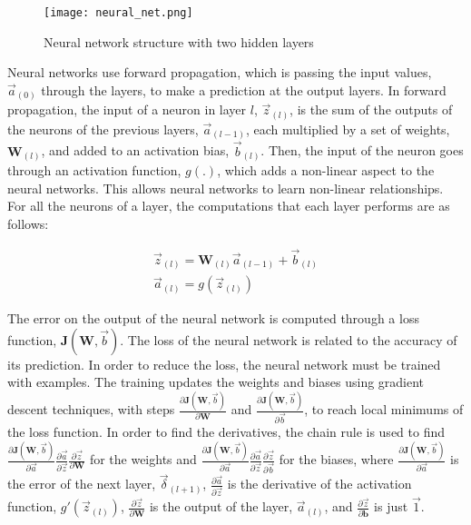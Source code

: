 \documentclass[conference]{IEEEtran}
\begin{document}
\begin{figure}[h]
\centering
\texttt{[image: neural\_net.png]}
\caption{Neural network structure with two hidden layers}
\label{fig:NNStructure}
\end{figure}

Neural networks use forward propagation, which is passing the input values, $\vec{a}_{(0)}$  through the layers, to make a prediction at the output layers. In forward propagation, the input of a neuron in layer $l$, $\vec{z}_{(l)}$, is the sum of the outputs of the neurons of the previous layers, $\vec{a}_{(l-1)}$, each multiplied by a set of weights, $\textbf{W}_{(l)}$, and added to an activation bias, $\vec{b}_{(l)}$. Then, the input of the neuron goes through an activation function, $g(.)$,  which adds a non-linear aspect to the neural networks. This allows neural networks to learn non-linear relationships. For all the neurons of a layer, the computations that each layer performs are as follows:
    
\begin{gather}
\vec{z}_{(l)} = \textbf{W}_{(l)}\vec{a}_{(l-1)} + \vec{b}_{(l)} \label{eq:neuronIn}\\
\vec{a}_{(l)} = g(\vec{z}_{(l)})                                \label{eq:neuronOut}
\end{gather}
    
The error on the output of the neural network is computed through a loss function, $\textbf{J}(\textbf{W}, \vec{b})$. The loss of the neural network is related to the accuracy of its prediction. In order to reduce the loss, the neural network must be trained with examples. The training updates the weights and biases using gradient descent techniques, with steps $\frac{\partial \textbf{J}(\textbf{W}, \vec{b})}{\partial \textbf{W}}$ and $\frac{\partial \textbf{J}(\textbf{W}, \vec{b})}{\partial \vec{b}}$, to reach local minimums of the loss function. In order to find the derivatives, the chain rule is used to find $\frac{\partial \textbf{J}(\textbf{W}, \vec{b})}{\partial \vec{a}}\frac{\partial \vec{a}}{\partial \vec{z}}\frac{\partial \vec{z}}{\partial \textbf{W}}$ for the weights and $\frac{\partial \textbf{J}(\textbf{W}, \vec{b})}{\partial \vec{a}}\frac{\partial \vec{a}}{\partial \vec{z}}\frac{\partial \vec{z}}{\partial \vec{b}}$ for the biases, where $\frac{\partial \textbf{J}(\textbf{W}, \vec{b})}{\partial \vec{a}}$ is the error of the next layer, $\vec{\delta}_{(l+1)}$, $\frac{\partial \vec{a}}{\partial \vec{z}}$ is the derivative of the activation function, $g'(\vec{z}_{(l)})$, $\frac{\partial \vec{z}}{\partial \textbf{W}}$ is the output of the layer, $\vec{a}_{(l)}$, and $\frac{\partial \vec{z}}{\partial \textbf{b}}$ is just $\vec{1}$.
    
\end{document}
